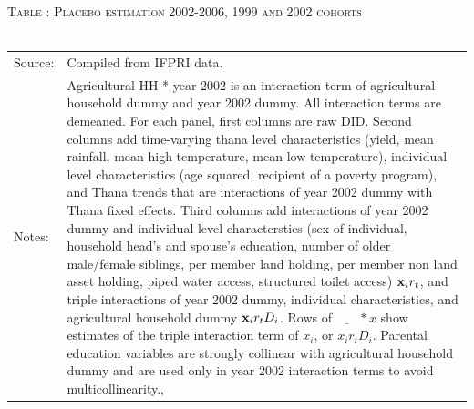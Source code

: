 \documentclass[12pt,letterpaper]{article}\usepackage[margin=1in]{geometry}
\newcommand{\bfx}{\ensuremath{\mbox{\bf x}}}
\newcommand{\0}{\ensuremath{\mbox{\boldmath $0$}}}
\begin{document}
{\begin{table}\hfil\textsc{\footnotesize Table \thetable: Placebo estimation 2002-2006, 1999 and 2002 cohorts\label{zEm.1999.10.sameN}}\\\setlength{\tabcolsep}{.5pt}\renewcommand{\arraystretch}{.675}\hspace{-2em}\hfil\\\renewcommand{\arraystretch}{1}\hfil\begin{tabular}{>{\hfill\scriptsize}p{1cm}<{}>{\scriptsize}p{12cm}<{\hfill}} Source:& Compiled from IFPRI data. \\[-1ex] Notes:&   \textsf{Agricultural HH * year 2002} is an interaction term of agricultural household dummy and year 2002 dummy. All interaction terms are demeaned. For each panel, first columns are raw DID. Second columns add time-varying thana level characteristics (yield, mean rainfall, mean high temperature, mean low temperature), individual level characteristics (age squared, recipient of a poverty program), and \textsf{Thana trends} that are interactions of year 2002 dummy with Thana fixed effects. Third columns add interactions of year 2002 dummy and individual level characterstics (sex of individual, household head's and spouse's education, number of older male/female siblings, per member land holding, per member non land asset holding, piped water access, structured toilet access) $\bfx_{i}r_{t}$, and triple interactions of year 2002 dummy, individual characteristics, and agricultural household dummy $\bfx_{i}r_{t}D_{i}$. Rows of $\underline{\phantom{mm}}*x$ show estimates of the triple interaction term of $x_{i}$, or $x_{i}r_{t}D_{i}$. Parental education variables are strongly collinear with agricultural household dummy and are used only in year 2002 interaction terms to avoid multicollinearity., \\   \end{tabular} \end{table}





}
\end{document}
